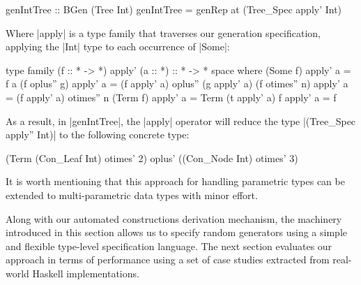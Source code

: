 \begin{code}
genIntTree :: BGen (Tree Int)
genIntTree = genRep at (Tree_Spec apply' Int)
\end{code}
%
Where |apply| is a type family that traverses our generation specification,
applying the |Int| type to each occurrence of |Some|:
%

\begin{code}
type family (f :: * -> *) apply' (a :: *) :: * -> * space where
  (Some f)         apply'  a  = f a
  (f oplus''  g)   apply'  a  = (f apply' a) oplus'' (g apply' a)
  (f otimes'' n)   apply'  a  = (f apply' a) otimes'' n
  (Term f)         apply'  a  = Term (t apply' a)
  f                apply'  a  = f
\end{code}
%
As a result, in |genIntTree|, the |apply| operator will reduce the type
|(Tree_Spec apply'' Int)| to the following concrete type:

\begin{code}
(Term (Con_Leaf Int) otimes' 2) oplus' ((Con_Node Int) otimes' 3)
\end{code}

It is worth mentioning that this approach for handling parametric types can be
extended to multi-parametric data types with minor effort.


Along with our automated constructions derivation mechanism, the machinery
introduced in this section allows us to specify random generators using a simple
and flexible type-level specification language.
%
The next section evaluates our approach in terms of performance using a set of
case studies extracted from real-world Haskell implementations.
